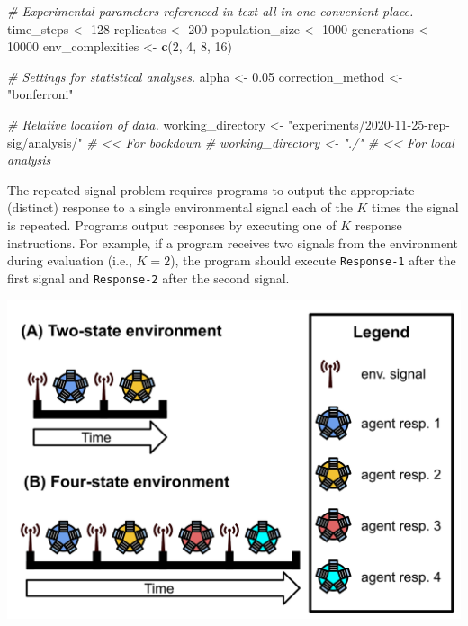 \documentclass[
]{book}
\newenvironment{Shaded}{\begin{snugshade}}{\end{snugshade}}
\newcommand{\CommentTok}[1]{\textcolor[rgb]{0.56,0.35,0.01}{\textit{#1}}}
\newcommand{\DecValTok}[1]{\textcolor[rgb]{0.00,0.00,0.81}{#1}}
\newcommand{\FloatTok}[1]{\textcolor[rgb]{0.00,0.00,0.81}{#1}}
\newcommand{\KeywordTok}[1]{\textcolor[rgb]{0.13,0.29,0.53}{\textbf{#1}}}
\newcommand{\NormalTok}[1]{#1}
\newcommand{\StringTok}[1]{\textcolor[rgb]{0.31,0.60,0.02}{#1}}
\begin{document}
\begin{Shaded}
\begin{Highlighting}[]
\CommentTok{\# Experimental parameters referenced in{-}text all in one convenient place.}
\NormalTok{time\_steps \textless{}{-}}\StringTok{ }\DecValTok{128}
\NormalTok{replicates \textless{}{-}}\StringTok{ }\DecValTok{200}
\NormalTok{population\_size \textless{}{-}}\StringTok{ }\DecValTok{1000}
\NormalTok{generations \textless{}{-}}\StringTok{ }\DecValTok{10000}
\NormalTok{env\_complexities \textless{}{-}}\StringTok{ }\KeywordTok{c}\NormalTok{(}\DecValTok{2}\NormalTok{, }\DecValTok{4}\NormalTok{, }\DecValTok{8}\NormalTok{, }\DecValTok{16}\NormalTok{)}

\CommentTok{\# Settings for statistical analyses.}
\NormalTok{alpha \textless{}{-}}\StringTok{ }\FloatTok{0.05}
\NormalTok{correction\_method \textless{}{-}}\StringTok{ "bonferroni"}

\CommentTok{\# Relative location of data.}
\NormalTok{working\_directory \textless{}{-}}\StringTok{ "experiments/2020{-}11{-}25{-}rep{-}sig/analysis/"} \CommentTok{\# \textless{}\textless{} For bookdown}
\CommentTok{\# working\_directory \textless{}{-} "./"                                     \# \textless{}\textless{} For local analysis}
\end{Highlighting}
\end{Shaded}

The repeated-signal problem requires programs to output the appropriate (distinct) response to a single environmental signal each of the \(K\) times the signal is repeated.
Programs output responses by executing one of \(K\) response instructions.
For example, if a program receives two signals from the environment during evaluation (i.e., \(K=2\)), the program should execute \texttt{Response-1} after the first signal and \texttt{Response-2} after the second signal.

\includegraphics{experiments/2020-11-25-rep-sig/analysis/../../../media/repeated-signal-task.png}
\end{document}
